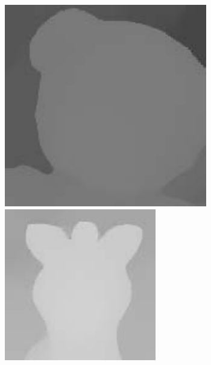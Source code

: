 \documentclass{bjtu-bachelor-thesis}
\begin{document}
\begin{figure}[!htbp]
\begin{minipage}[b]{\linewidth}
{\begin{minipage}[b]{0.085\linewidth}
      \includegraphics[width=\linewidth]{figures/doll/ours_0.pdf}\vspace{2pt}
      \includegraphics[width=\linewidth]{figures/doll/ours_1.pdf}

\end{minipage}}
\end{minipage}
\end{figure}
\end{document}

